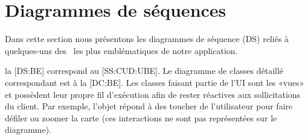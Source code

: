\chapter{Diagrammes de séquences}

Dans cette section nous présentons les diagrammes de séquence (DS) reliés à quelques-uns des \cu\ les plus emblématiques de notre application.

\startitemize
\item la [DS:BE] correspond au \in{\cu}[SS:CUD:UBE].
Le diagramme de classes détaillé correspondant est à la [DC:BE].
Les classes faisant partie de l'UI sont les «vues» et possèdent leur propre fil d'exécution afin de rester réactives aux sollicitations du client.
Par exemple, l'objet  répond à des toucher de l'utilisateur pour faire défiler ou zoomer la carte (ces interactions ne sont pas représentées sur le diagramme).
\stopitemize


